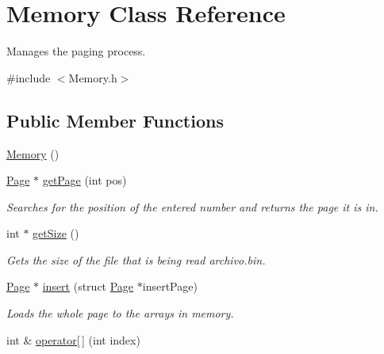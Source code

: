 \hypertarget{classMemory}{}\section{Memory Class Reference}
\label{classMemory}


Manages the paging process.  




{\ttfamily \#include $<$Memory.\+h$>$}

\subsection*{Public Member Functions}
\begin{DoxyCompactItemize}
\item 
\mbox{\hyperlink{classMemory_a585d7bb6fc6f2237bcebf94a86b7dd99}{Memory}} ()
\item 
\mbox{\hyperlink{structPage}{Page}} $\ast$ \mbox{\hyperlink{classMemory_a08387437b7d616155328f887808f65b7}{get\+Page}} (int pos)
\begin{DoxyCompactList}\small\item\em Searches for the position of the entered number and returns the page it is in. \end{DoxyCompactList}\item 
int $\ast$ \mbox{\hyperlink{classMemory_a95daaddc99eb1a089ea3b9f2362b249c}{get\+Size}} ()
\begin{DoxyCompactList}\small\item\em Gets the size of the file that is being read archivo.\+bin. \end{DoxyCompactList}\item 
\mbox{\hyperlink{structPage}{Page}} $\ast$ \mbox{\hyperlink{classMemory_a93f9a283abd85a44a0c7a36c3b3c6167}{insert}} (struct \mbox{\hyperlink{structPage}{Page}} $\ast$insert\+Page)
\begin{DoxyCompactList}\small\item\em Loads the whole page to the arrays in memory. \end{DoxyCompactList}\item 
int \& \mbox{\hyperlink{classMemory_abeefba4f18f5396c0635003bc028b013}{operator\mbox{[}$\,$\mbox{]}}} (int index)
\end{DoxyCompactItemize}
